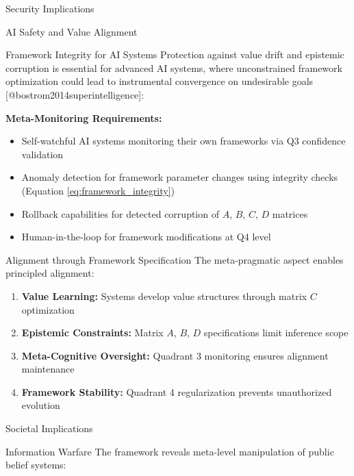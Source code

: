 \documentclass[
  ignorenonframetext,
]{beamer}
\providecommand{\tightlist}{%
  \setlength{\itemsep}{0pt}\setlength{\parskip}{0pt}}
\begin{document}
\begin{frame}{Security Implications}
\begin{block}{AI Safety and Value Alignment}
\begin{block}{Framework Integrity for AI Systems}
\protect{}\label{framework-integrity-for-ai-systems}
Protection against value drift and epistemic corruption is essential for
advanced AI systems, where unconstrained framework optimization could
lead to instrumental convergence on undesirable goals
{[}@bostrom2014superintelligence{]}:

\textbf{Meta-Monitoring Requirements:}

\begin{itemize}
\tightlist
\item
  Self-watchful AI systems monitoring their own frameworks via Q3
  confidence validation
\item
  Anomaly detection for framework parameter changes using integrity
  checks (Equation \eqref{eq:framework_integrity})
\item
  Rollback capabilities for detected corruption of \(A\), \(B\), \(C\),
  \(D\) matrices
\item
  Human-in-the-loop for framework modifications at Q4 level
\end{itemize}
\end{block}

\begin{block}{Alignment through Framework Specification}
\protect{}\label{alignment-through-framework-specification}
The meta-pragmatic aspect enables principled alignment:

\begin{enumerate}
\tightlist
\item
  \textbf{Value Learning:} Systems develop value structures through
  matrix \(C\) optimization
\item
  \textbf{Epistemic Constraints:} Matrix \(A\), \(B\), \(D\)
  specifications limit inference scope
\item
  \textbf{Meta-Cognitive Oversight:} Quadrant 3 monitoring ensures
  alignment maintenance
\item
  \textbf{Framework Stability:} Quadrant 4 regularization prevents
  unauthorized evolution
\end{enumerate}
\end{block}
\end{block}

\begin{block}{Societal Implications}
\protect{}\label{sec:societal_security}
\begin{block}{Information Warfare}
\protect{}\label{information-warfare}
The framework reveals meta-level manipulation of public belief systems:


\end{block}
\end{block}
\end{frame}
\end{document}
